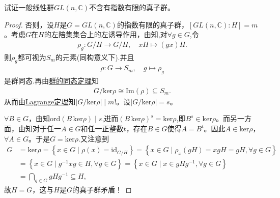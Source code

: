 \documentclass[../../main.tex]{subfiles}%
\begin{document}
\begin{example}
试证一般线性群$GL(n,\mathbb{C})$不含有指数有限的真子群。
\end{example}
\begin{proof}
否则，设$H$是$G=GL(n,\mathbb{C})$的指数有限的真子群，$[GL(n,\mathbb{C}):H]=m$。考虑$G$在$H$的左陪集集合上的左诱导作用，由知,对$\forall g\in G$,令
\begin{align*}
\rho_g:G/H\rightarrow G/H,\quad xH\mapsto (gx)H.
\end{align*}
则$\rho_g$都可视为$S_m$的元素(同构意义下).并且
\begin{align*}
\rho:G\rightarrow S_m,\quad g\mapsto \rho_g
\end{align*}
是群同态.再由\hyperref[theorem:群的同态基本定理]{群的同态定理}知
\begin{align*}
G/\mathrm{ker}\rho\cong \mathrm{Im}(\rho)\subseteq S_m.
\end{align*}
从而由\hyperref[theorem:抽象代数--Lagrange定理]{Lagrange定理}知$|G/\mathrm{ker}\rho|\mid m!$。设$|G/\mathrm{ker}\rho|=s$。

$\forall B\in G$，由知$\text{ord}(B\,\mathrm{ker}\rho) \mid s$,进而$(B\,\mathrm{ker}\rho)^s=\mathrm{ker}\rho$,即$B^s\in \mathrm{ker}\rho$。而另一方面，由知对于任一$A\in G$和任一正整数$t$，存在$B\in G$使得$A=B^t$。因此$A\in \mathrm{ker}\rho$，$\forall A\in G$。于是$G=\mathrm{ker}\rho$.又注意到
\begin{align*}
G&=\mathrm{ker}\rho =\left\{ x\in G\mid \rho \left( x \right) =\mathrm{id}_{G/H} \right\} =\left\{ x\in G\mid \rho _x\left( gH \right) =xgH=gH,\forall g\in G \right\} 
\\
&=\left\{ x\in G\mid g^{-1}xg\in H,\forall g\in G \right\} =\left\{ x\in G\mid x\in gHg^{-1},\forall g\in G \right\} 
\\
&=\bigcap_{g\in G}{gHg^{-1}}\subseteq H,
\end{align*}
故$H=G$，这与$H$是$G$的真子群矛盾！

\end{proof}
\end{document}
